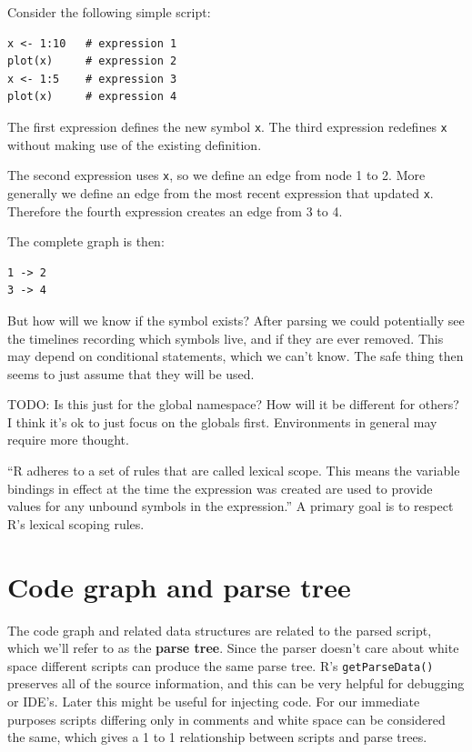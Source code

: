 \documentclass[12pt]{article}
\begin{document}
Consider the following simple script:

\begin{verbatim}
x <- 1:10   # expression 1
plot(x)     # expression 2
x <- 1:5    # expression 3
plot(x)     # expression 4
\end{verbatim}

The first expression defines the new symbol \texttt{x}. The third
expression redefines \texttt{x} without making use of the existing
definition.

The second expression uses \texttt{x}, so we define an edge from node 1 to 2.
More generally we define an edge from the most recent expression that
updated \texttt{x}. Therefore the fourth expression creates an edge from 3
to 4.

The complete graph is then:

\begin{verbatim}
1 -> 2
3 -> 4
\end{verbatim}

But how will we know if the symbol exists? After parsing we could
potentially see the timelines recording which symbols live, and if they are
ever removed. This may depend on conditional statements, which we can't
know. The safe thing then seems to just assume that they will be used.

TODO: Is this just for the global namespace? How will it be different for
others? I think it's ok to just focus on the globals first. Environments in
general may require more thought.

``R adheres to a set of rules that are called lexical scope. This means the
variable bindings in effect at the time the expression was created are used
to provide values for any unbound symbols in the expression.''
\cite{Rlang} A primary goal is to respect R's lexical scoping rules.


\section{Code graph and parse tree }

The code graph and related data structures are related to the parsed
script, which we'll refer to as the \textbf{parse tree}. Since the parser
doesn't care about white space different scripts can produce the same parse
tree. R's \texttt{getParseData()} preserves all of the source
information, and this can be very helpful for debugging or IDE's. Later
this might be useful for injecting code.
For our immediate purposes scripts differing only in comments and white space can be
considered the same, which gives a 1 to 1 relationship between scripts and
parse trees. 
\end{document}
